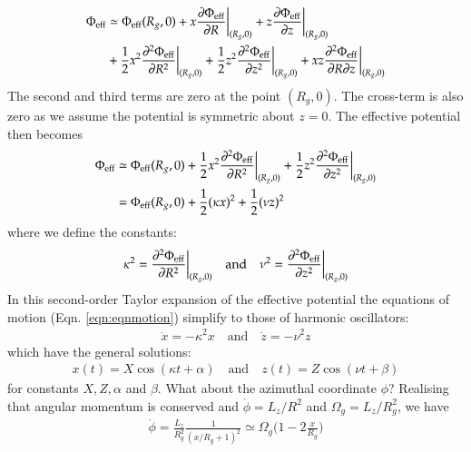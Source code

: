 \begin{align}
\begin{split}
\Phi_{\rm eff} &\simeq \Phi_{\rm eff}(R_{g},0) + x\frac{\partial\Phi_{\rm eff}}{\partial R}\bigg|_{(R_{g},0)} + z\frac{\partial\Phi_{\rm eff}}{\partial z}\bigg|_{(R_{g},0)}\\
&+ \frac{1}{2}x^{2}\frac{\partial^{2}\Phi_{\rm eff}}{\partial R^{2}}\bigg|_{(R_{g},0)} + \frac{1}{2}z^{2}\frac{\partial^{2}\Phi_{\rm eff}}{\partial z^{2}}\bigg|_{(R_{g},0)} + xz\frac{\partial^{2}\Phi_{\rm eff}}{\partial R\partial z}\bigg|_{(R_{g},0)} 
\end{split}
\end{align}
The second and third terms are zero at the point $(R_{g},0)$. The cross-term is also zero as we assume the potential is symmetric about $z=0$. The effective potential then becomes
\begin{align}
\begin{split}
\Phi_{\rm eff} &\simeq \Phi_{\rm eff}(R_{g},0) + \frac{1}{2}x^{2}\frac{\partial^{2}\Phi_{\rm eff}}{\partial R^{2}}\bigg|_{(R_{g},0)} + \frac{1}{2}z^{2}\frac{\partial^{2}\Phi_{\rm eff}}{\partial z^{2}}\bigg|_{(R_{g},0)}\\
&= \Phi_{\rm eff}(R_{g},0) + \frac{1}{2}(\kappa x)^{2} + \frac{1}{2}(\nu z)^{2}
\end{split}
\end{align}
where we define the constants:
\begin{align} 
\kappa^{2} = \frac{\partial^{2} \Phi_{\rm eff}}{\partial R^2}\bigg|_{(R_{g},0)} \quad\textrm{and}\quad \nu^{2} = \frac{\partial^{2} \Phi_{\rm eff}}{\partial z^2}\bigg|_{(R_{g},0)}
\end{align}
In this second-order Taylor expansion of the effective potential the equations of motion (Eqn. \ref{eqn:eqnmotion}) simplify to those of harmonic oscillators:
\begin{align}\label{eqn:harmonic}
\ddot{x} = -\kappa^{2} x \quad\textrm{and}\quad \ddot{z} = -\nu^{2} z
\end{align}
which have the general solutions:
\begin{align}\label{eqn:xz}
x(t) = X\cos(\kappa t + \alpha)\quad \textrm{and}\quad z(t) = Z\cos(\nu t + \beta)
\end{align}
for constants $X,Z,\alpha$ and $\beta$. What about the azimuthal coordinate $\phi$? Realising that angular momentum is conserved and $\dot{\phi}=L_{z}/R^{2}$ and $\Omega_{g}=L_{z}/R_{g}^{2}$, we have
\begin{align}
\dot{\phi} = \frac{L_{z}}{R_{g}^{2}}\frac{1}{(x/R_{g}+1)^{2}} \simeq \Omega_{g}\bigg(1-2\frac{x}{R_{g}}\bigg)
\end{align}
